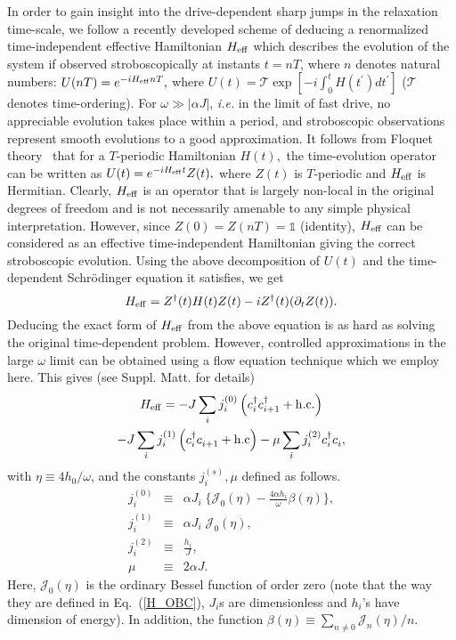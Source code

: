 \documentclass[reprint,preprintnumbers,showpacs,amsmath,twocolumn,showkeys,aps,prl]{revtex4-1}
\begin{document}
In order to gain insight into the drive-dependent sharp jumps in the relaxation time-scale,
we follow a recently developed scheme \cite{Mintert} of deducing a renormalized time-independent effective 
Hamiltonian $H_{\rm eff}$ which describes the evolution of the system if observed stroboscopically at instants
$t = nT$, where $n$ denotes natural numbers: $U(nT) = e^{-iH_{\rm eff}nT},$ 
where $U(t) = {\mathcal T}\exp{[-i\int_{0}^{t}H(t^{\prime})dt^{\prime}]}$ (${\mathcal T}$ denotes time-ordering).  
For $\omega \gg |\alpha J|$, \textit{i.e.} in the limit of fast drive, no appreciable evolution takes place within a 
period, and stroboscopic observations represent smooth evolutions to a good approximation.  
It follows from Floquet theory~\cite{Floquet-Original} that for a $T$-periodic Hamiltonian $H(t),$ 
the time-evolution operator can be written as $U(t) = e^{-iH_{\rm eff}t}Z(t),$ where $Z(t)$ is $T$-periodic 
and $H_{\rm eff}$ is Hermitian. Clearly, $H_{\rm eff}$ is an operator that is largely non-local in the original 
degrees of freedom and is not necessarily amenable to any simple physical interpretation. 
However, since $Z(0)=Z(nT)=\mathds{1}$ (identity), $H_{\rm eff}$ can be considered as
an effective time-independent Hamiltonian giving the correct stroboscopic evolution. 
Using the above decomposition of $U(t)$ and the time-dependent Schr\"{o}dinger equation it satisfies, we get
\begin{equation} 
H_{\rm eff} = Z^{\dagger}(t)H(t)Z(t) -iZ^{\dagger}(t)(\partial_{t}Z(t)).
\label{Heff} 
\end{equation}
\noindent
Deducing the exact form of $H_{\rm eff}$ from the above equation is as hard as solving the original 
time-dependent problem. However, controlled approximations in the large $\omega$ limit can
be obtained \cite{Mintert} using a flow equation technique \cite{Wegner,Kehrein-book} 
which we employ here. This gives (see Suppl. Matt. for details)
\begin{multline}
\label{eq:heff}
H_{\rm eff}    =   -J\sum_i j^{(0)}_i\left(c^\dagger_i c^\dagger_{i+1} + \rm{h.c.}\right) \\
		            -J\sum_i j^{(1)}_i\left(c^\dagger_i c^{\;}_{i+1}+\rm{h.c}\right) 
		            -\mu\sum_i j^{(2)}_i c^\dagger_i c^{\;}_i,
\end{multline}
with $\eta \equiv 4h_0/\omega$, and the constants $j^{(s)}_i, \mu $ defined as follows.
\begin{eqnarray}
j^{(0)}_i            &\equiv& \alpha J_i\; \bigg\{\mathcal{J}_0(\eta) - \frac{4\alpha h_i}{\omega}\beta(\eta)\bigg\} ,\nonumber \\
j^{(1)}_i            &\equiv& \alpha J_i \; \mathcal{J}_0(\eta) ,\nonumber \\
j^{(2)}_i            &\equiv& \frac{h_i}{J},\nonumber \\
\mu 		     &\equiv& 2\alpha J.
\label{Renorm_fctr}
\end{eqnarray}
Here, $\mathcal{J}_0(\eta)$ is the ordinary Bessel function of order zero
(note that the way they are defined in Eq.~(\ref{H_OBC}), $J_{i}$s are 
dimensionless and $h_{i}$'s have dimension of energy). In addition, the function $\beta(\eta)\equiv\sum_{n\neq 0} {\mathcal{J}_n(\eta)}/{n}$. 
\end{document}

